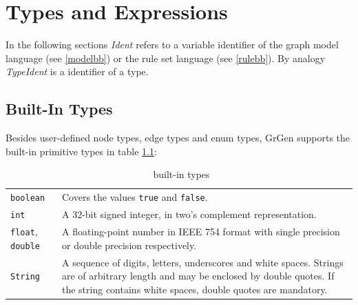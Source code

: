 \chapter{Types and Expressions}
\label{typeexpr}

In the following sections \emph{Ident} refers to a variable identifier of the graph model language (see \ref{modelbb}) or the rule set language (see \ref{rulebb}). By analogy \emph{TypeIdent} is a identifier of a type.

\section{Built-In Types}
\label{builtin}
Besides user-defined node types, edge types and enum types, GrGen supports the built-in primitive types in table \ref{builtintypes}:
\begin{table}[htbp]
\begin{tabularx}{\linewidth}{|l|X|}\hline
	\texttt{boolean} & Covers the values \texttt{true} and \texttt{false}. \\
	\texttt{int} & A 32-bit signed integer, in two's complement representation. \\
	\texttt{float}, \texttt{double} & A floating-point number in IEEE 754 format with single precision or double precision respectively. \\
	\texttt{String} & A sequence of digits, letters, underscores and white spaces. Strings are of arbitrary length and may be enclosed by double quotes. If the string contains white spaces, double quotes are mandatory.\\ \hline
\end{tabularx}
\caption{\GrG\ built-in types}
\label{builtintypes}
\end{table}

